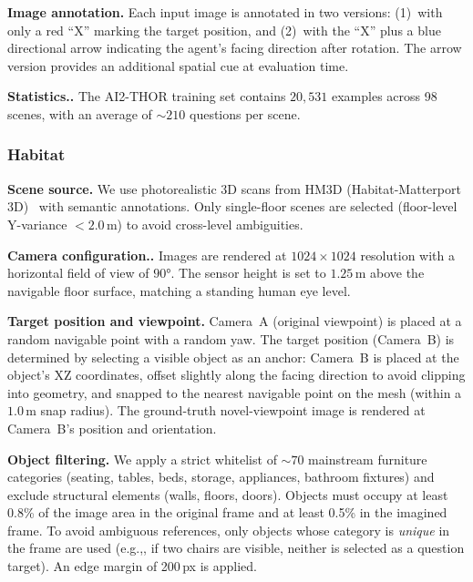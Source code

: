 \documentclass{llmxive}
\providecommand{\eg}{e.g.,\xspace}
\providecommand{\paragraph}[1]{\vspace{.5em}\noindent\textbf{#1.}}
\begin{document}
\noindent\textbf{Image annotation.}
Each input image is annotated in two versions: (1)~with only a red ``X'' marking the target position, and (2)~with the ``X'' plus a blue directional arrow indicating the agent's facing direction after rotation.
The arrow version provides an additional spatial cue at evaluation time.

\paragraph{Statistics.}
The AI2-THOR training set contains $20{,}531$ examples across 98 scenes, with an average of ${\sim}210$ questions per scene.

\subsubsection{Habitat}

\noindent\textbf{Scene source.}
We use photorealistic 3D scans from HM3D (Habitat-Matterport 3D)~\cite{chang2017matterport3d} with semantic annotations.
Only single-floor scenes are selected (floor-level Y-variance $< 2.0$\,m) to avoid cross-level ambiguities.

\paragraph{Camera configuration.}
Images are rendered at $1024 \times 1024$ resolution with a horizontal field of view of $90°$.
The sensor height is set to $1.25$\,m above the navigable floor surface, matching a standing human eye level.

\noindent\textbf{Target position and viewpoint.}
Camera~A (original viewpoint) is placed at a random navigable point with a random yaw.
The target position (Camera~B) is determined by selecting a visible object as an anchor: Camera~B is placed at the object's XZ coordinates, offset slightly along the facing direction to avoid clipping into geometry, and snapped to the nearest navigable point on the mesh (within a $1.0$\,m snap radius).
The ground-truth novel-viewpoint image is rendered at Camera~B's position and orientation.

\noindent\textbf{Object filtering.}
We apply a strict whitelist of ${\sim}70$ mainstream furniture categories (seating, tables, beds, storage, appliances, bathroom fixtures) and exclude structural elements (walls, floors, doors).
Objects must occupy at least 0.8\% of the image area in the original frame and at least 0.5\% in the imagined frame.
To avoid ambiguous references, only objects whose category is \emph{unique} in the frame are used (\eg, if two chairs are visible, neither is selected as a question target).
An edge margin of 200\,px is applied.
\end{document}
